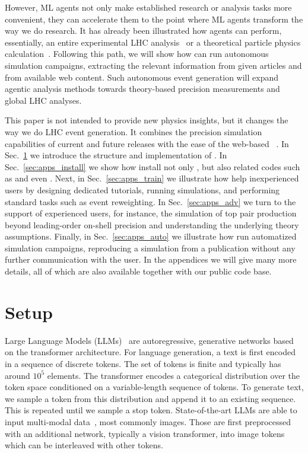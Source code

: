 \documentclass[submission, Phys]{SciPost}
\begin{document}
However, ML agents not only make established research or analysis tasks more convenient, they can accelerate them to the point where  ML agents transform the way we do research. It has already been illustrated how agents can perform, essentially, an entire experimental LHC analysis~\cite{Diefenbacher:2025zzn} or a theoretical particle physics calculation~\cite{Schwartz:2026ekw}. Following this path, we will show how \ma can run autonomous simulation campaigns, extracting the relevant information from given articles and from available web content. Such autonomous event generation will expand agentic analysis methods towards theory-based precision measurements and global LHC analyses.

This paper is not intended to provide new physics insights, but it changes the way we do LHC event generation. It combines the precision simulation capabilities of current and future \mg releases with the ease of the web-based ~\cite{Alwall:2007st}.  In Sec.~\ref{sec:ma} we introduce the structure and implementation of \ma. In Sec.~\ref{sec:apps_install} we show how \ma install not only \mg, but also related codes such as \delphes and even \textsc{\root}. Next, in Sec.~\ref{sec:apps_train} we illustrate how \ma help inexperienced users by designing dedicated \mg tutorials, running simulations, and performing standard tasks such as event reweighting. In Sec.~\ref{sec:apps_adv} we turn to the support of experienced users, for instance, the simulation of top pair production beyond leading-order on-shell precision and understanding the underlying theory assumptions. Finally, in Sec.~\ref{sec:apps_auto} we illustrate how \ma run automatized simulation campaigns, reproducing a simulation from a publication without any further communication with the user. In the appendices we will give many more details, all of which are also available together with our public code base.

\clearpage
\section{Setup}
\label{sec:ma}

Large Language Models (LLMs)~\cite{zhao2023survey} are autoregressive, generative networks based on the transformer architecture. For language generation, a text is first encoded in a sequence of discrete tokens. The set of tokens is finite and typically has around $10^5$ elements. The transformer encodes a categorical distribution over the token space conditioned on a variable-length sequence of tokens. To generate text, we sample a token from this distribution and append it to an existing sequence. This is repeated until we sample a stop token. State-of-the-art LLMs are able to input multi-modal data~\cite{yin2024survey}, most commonly images. Those are first preprocessed with an additional network, typically a vision transformer, into image tokens which can be interleaved with other tokens.
\end{document}
